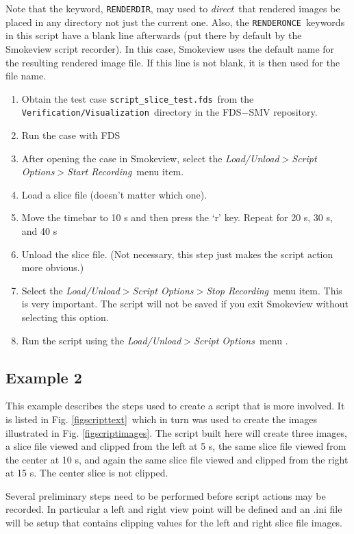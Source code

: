 \documentclass[11pt,twoside]{book}
\begin{document}
Note that the keyword, {\tt RENDERDIR}, may used to {\em direct}\ that rendered images
be placed in any directory not just the current one.  Also, the {\tt RENDERONCE}\ keywords
in this script have a blank line afterwards (put there by default by the Smokeview script
recorder).
In this case, Smokeview uses the default name for the resulting rendered image file.
If this line is not blank, it is then used for the file name.

\begin{enumerate}
\item Obtain the test case {\tt script\_slice\_test.fds}\ from the
    {\tt Verification/Visualization}\ directory in
the FDS$-$SMV repository.
\item Run the case with FDS
\item After opening the case in Smokeview,
select the {\em Load/Unload$>$Script Options$>$Start Recording}\ menu item.
\item Load a slice file (doesn't matter which one).
\item Move the timebar to 10 s and
then press the `r' key.  Repeat for 20 s, 30 s, and 40 s
\item Unload the slice file. (Not necessary, this step
just makes the script action more obvious.)
\item Select the {\em Load/Unload$>$Script Options$>$Stop Recording}\
menu item.  This is very important.  The script will not be saved
if you exit Smokeview without selecting this option.
\item Run the script using the
  {\em Load/Unload$>$Script Options}\ menu .
\end{enumerate}

\subsection{Example 2}
This example describes the steps used to create a script that is more involved.
It is listed
in Fig. \ref{figscripttext}\ which in turn was used to
create the images
illustrated in Fig. \ref{figscriptimages}.  The script built here
will create three images,
a slice file viewed and clipped from the left at 5 s,
the same slice file viewed from the center at 10 s,
and again the same slice file viewed and clipped from the right at 15 s.
The center slice is not clipped.

Several preliminary steps need to be performed before script actions may be recorded.
In particular a left and right view point will be defined and
an .ini file will be setup that contains clipping values for the
left and right slice file images.
\end{document}
